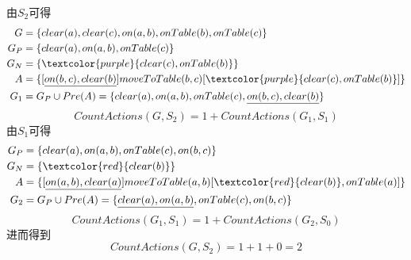 \documentclass[a4paper, 11pt]{article}
\begin{document}
\begin{answer}
\begin{itemize}
\begin{figure}[H]
    \end{figure}
    由$S_2$可得
    \[\begin{aligned}
        G&=\{clear(a),clear(c),on(a,b),onTable(b),onTable(c)\}\\
        G_P&=\{clear(a),on(a,b),onTable(c)\}\\
        G_N&=\{\textcolor{purple}{clear(c),onTable(b)}\}\\
        A&=\{[\underline{on(b,c),clear(b)}]moveToTable(b,c)[\textcolor{purple}{clear(c),onTable(b)}]\}\\
        G_1&=G_P\cup Pre(A)=\{clear(a),on(a,b),onTable(c),\underline{on(b,c),clear(b)}\}
    \end{aligned}\]
    \[CountActions(G,S_2)=1+CountActions(G_1,S_1)\]
    由$S_1$可得
    \[\begin{aligned}
        G_P&=\{clear(a),on(a,b),onTable(c),on(b,c)\}\\
        G_N&=\{\textcolor{red}{clear(b)}\}\\
        A&=\{[\underline{on(a,b),clear(a)}]moveToTable(a,b)[\textcolor{red}{clear(b)},onTable(a)]\}\\
        G_2&=G_P\cup Pre(A)=\{\underline{clear(a),on(a,b)},onTable(c),on(b,c)\}
    \end{aligned}\]
    \[CountActions(G_1,S_1)=1+CountActions(G_2,S_0)\]
    进而得到
    \[CountActions(G,S_2)=1+1+0=2\]
\end{itemize}
\end{answer}
\end{document}

